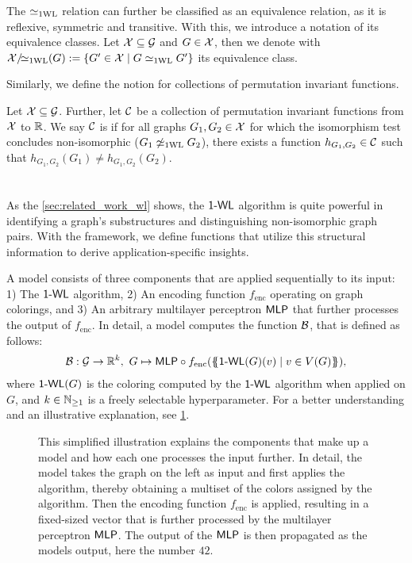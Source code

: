 The $\simeq_{\text{1WL}}$ relation can further be classified as an equivalence relation, as it is reflexive, symmetric and transitive. With this, we introduce a notation of its equivalence classes. Let $\mathcal{X} \subseteq \mathcal{G}$ and $G \in \mathcal{X}$, then we denote with $\mathcal{X}/\!{\simeq_{\text{1WL}}}(G): = \{ G' \in \mathcal{X} \mid G \simeq_{\text{1WL}} G' \}$ its equivalence class.

Similarly, we define the notion \wldisc for collections of permutation invariant functions.

\begin{definition}[\wldisc]
    Let $\mathcal{X} \subseteq \mathcal{G}$. Further, let $\mathcal{C}$ be a collection of permutation invariant functions from $\mathcal{X}$ to $\mathbb{R}$. We say $\mathcal{C}$ is \wldisc if for all graphs $G_1, G_2 \in \mathcal{X}$ for which the \wl isomorphism test concludes non-isomorphic ($G_1 \not\simeq_{\text{1WL}} G_2$), there exists a function $h_{G_1, G_2} \in \mathcal{C}$ such that $h_{G_1, G_2}(G_1) \neq h_{G_1, G_2}(G_2)$.
\end{definition}

\section{\wlnn}\label{sec:definition_wlnn}
As the \cref{sec:related_work_wl} shows, the $\textsf{1-WL}$ algorithm is quite powerful in identifying a graph's substructures and distinguishing non-isomorphic graph pairs. With the \wlnn framework, we define functions that utilize this structural information to derive application-specific insights.

\begin{definition}[\wlnn]
    A \wlnn model consists of three components that are applied sequentially to its input: 1) The $\textsf{1-WL}$ algorithm, 2) An encoding function $f_\text{enc}$ operating on graph colorings, and 3) An arbitrary multilayer perceptron $\textsf{MLP}$ that further processes the output of $f_\text{enc}$. In detail, a \wlnn model computes the function $\mathcal{B}$, that is defined as follows:
    \begin{align*}
        \mathcal{B}: \mathcal{G} \rightarrow \mathbb{R}^k, \ G \mapsto \textsf{MLP} \circ f_{\text{enc}}(\{\!\!\{ \textsf{1-WL}(G)(v) \mid v \in V(G) \}\!\!\}),
    \end{align*}
    where $\textsf{1-WL}(G)$ is the coloring computed by the $\textsf{1-WL}$ algorithm when applied on $G$, and $k \in \mathbb{N}_{\geq 1}$ is a freely selectable hyperparameter. For a better understanding and an illustrative explanation, see \cref{fig:wlnn}.
\end{definition}

\begin{figure}[!htb]
    \centering
    
    \caption{This simplified illustration explains the components that make up a \wlnn model and how each one processes the input further. In detail, the model takes the graph on the left as input and first applies the \wl algorithm, thereby obtaining a multiset of the colors assigned by the algorithm. Then the encoding function $f_\text{enc}$ is applied, resulting in a fixed-sized vector that is further processed by the multilayer perceptron $\textsf{MLP}$. The output of the $\textsf{MLP}$ is then propagated as the \wlnn models output, here the number $42$.}
    \label{fig:wlnn}
\end{figure}

